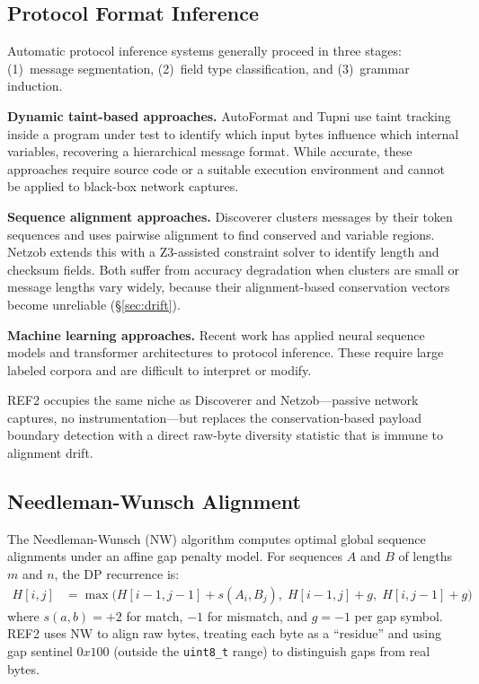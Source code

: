 \documentclass[letterpaper,twocolumn,10pt]{article}
\begin{document}
\subsection{Protocol Format Inference}

Automatic protocol inference systems generally proceed in three stages:
(1)~message segmentation, (2)~field type classification, and (3)~grammar
induction.

\textbf{Dynamic taint-based approaches.}  AutoFormat \cite{autoformat} and
Tupni \cite{tupni} use taint tracking inside a program under test to identify
which input bytes influence which internal variables, recovering a hierarchical
message format.  While accurate, these approaches require source code or a
suitable execution environment and cannot be applied to black-box network
captures.

\textbf{Sequence alignment approaches.}  Discoverer \cite{discoverer} clusters
messages by their token sequences and uses pairwise alignment to find conserved
and variable regions.  Netzob \cite{netzob} extends this with a Z3-assisted
constraint solver to identify length and checksum fields.  Both suffer from
accuracy degradation when clusters are small or message lengths vary widely,
because their alignment-based conservation vectors become unreliable
(\S\ref{sec:drift}).

\textbf{Machine learning approaches.}  Recent work has applied neural sequence
models \cite{fieldhint} and transformer architectures \cite{netplier} to
protocol inference.  These require large labeled corpora and are difficult to
interpret or modify.

\textsc{REF2} occupies the same niche as Discoverer and Netzob---passive
network captures, no instrumentation---but replaces the conservation-based
payload boundary detection with a direct raw-byte diversity statistic that is
immune to alignment drift.

\subsection{Needleman-Wunsch Alignment}

The Needleman-Wunsch (NW) algorithm \cite{nw1970} computes optimal global
sequence alignments under an affine gap penalty model.  For sequences $A$ and
$B$ of lengths $m$ and $n$, the DP recurrence is:
\begin{align}
  H[i,j] &= \max\bigl(
    H[i{-}1,j{-}1] + s(A_i, B_j),\;
    H[i{-}1,j] + g,\;
    H[i,j{-}1] + g
  \bigr) \label{eq:nw}
\end{align}
where $s(a,b)=+2$ for match, $-1$ for mismatch, and $g=-1$ per gap symbol.
\textsc{REF2} uses NW to align raw bytes, treating each byte as a ``residue''
and using gap sentinel $0x100$ (outside the \texttt{uint8\_t} range) to
distinguish gaps from real bytes.
\end{document}
